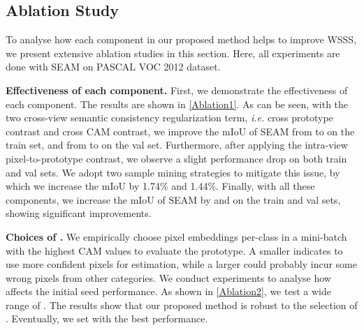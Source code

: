 \documentclass[10pt,twocolumn,letterpaper]{article}
\begin{document}
\subsection{Ablation Study}
To analyse how each component in our proposed method helps to improve WSSS, we present extensive ablation studies in this section. 
Here, all experiments are done with SEAM on PASCAL VOC 2012 dataset.

\textbf{Effectiveness of each component.} First, we demonstrate the effectiveness of each component. The results are shown in \cref{Ablation1}. As can be seen, with the two cross-view semantic consistency regularization term, \textit{i.e.} cross prototype contrast and cross CAM contrast, we improve the mIoU of SEAM from  to  on the train set, and from   to  on the val set.
Furthermore, after applying the intra-view pixel-to-prototype contrast, we observe a slight performance drop on both train and val sets.
We adopt two sample mining strategies to mitigate this issue, by which we increase the mIoU by 1.74\% and 1.44\%.
Finally, with all these components, we increase the mIoU of SEAM by  and  on the train and val sets, showing significant improvements.

\textbf{Choices of .} We empirically choose  pixel embeddings per-class in a mini-batch with the highest CAM values to evaluate the prototype.
A smaller  indicates to use more confident pixels for estimation, while a larger  could probably incur some wrong pixels from other categories. 
We conduct experiments to analyse how  affects the initial seed performance.
As shown in \cref{Ablation2}, we test a wide range of .
The results show that our proposed method is robust to the selection of . Eventually, we set  with the best performance.
\end{document}
